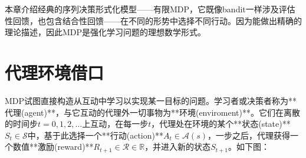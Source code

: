 \documentclass{ctexart}
\begin{document}
本章介绍经典的序列决策形式化模型——有限MDP，它既像bandit一样涉及评估性回馈，也包含结合性回馈——在不同的形势中选择不同行动。因为能做出精确的理论描述，因此MDP是强化学习问题的理想数学形式。

\section{代理环境借口}

MDP试图直接构造从互动中学习以实现某一目标的问题。学习者或决策者称为**代理(agent)**，与它互动的代理外一切事物为**环境(enviroment)**。它们在离散的时间步$t=0,1,2,\dots$上互动，在每一步$t$，代理处在环境的某个**状态(state)**$S_t \in \mathcal S$中，基于此选择一个**行动(action)**$A_t \in \mathcal A(s)$，一步之后，代理获得一个数值**激励(reward)**$R_{t+1} \in \mathcal R \in \mathbb R$，并进入新的状态$S_{t+1}$。如下图：
\end{document}
